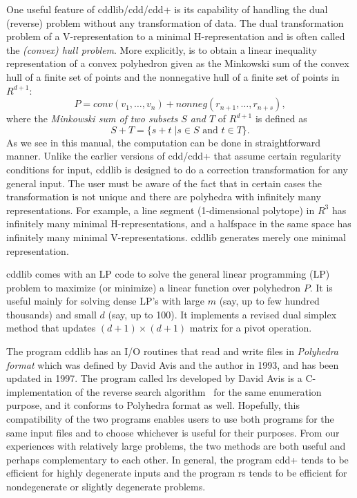 \documentclass[11pt]{article}
\newcommand {\0} {{\bf 0}}
\begin{document}
One useful feature of  cddlib/cdd/cdd+ is its capability
of handling the dual (reverse)  problem without any transformation
of data.  The dual transformation problem of a V-representation
to a minimal H-representation and is often called the 
{\em (convex) hull problem\/}.  More explicitly,
is to obtain a linear inequality representation
of a convex polyhedron given as the Minkowski sum of 
the convex hull of a finite set of points and the nonnegative
hull of a finite set of points in $R^{d+1}$: 
\[
P = conv(v_1,\ldots,v_n) +  nonneg(r_{n+1},\ldots,r_{n+s}), 
\]
where
 the {\em Minkowski sum of two subsets $S$ and $T$} of $R^{d+1}$ is defined
as 
\[
S + T = \{ s + t \; |  s \in S \mbox{ and } t \in T \}.
\]
As we see in this manual, the computation can be done
in straightforward manner.  Unlike the earlier versions of
cdd/cdd+ that assume certain regularity conditions for input, 
cddlib is designed to do a correction transformation for any general input.
The user must be aware of the fact that in certain cases the
transformation is not unique and there are polyhedra with
infinitely many representations.  For example, a line
segment (1-dimensional polytope) in $R^3$ has infinitely
many minimal H-representations, and a halfspace in the same space
has infinitely many minimal V-representations.  cddlib generates
merely one minimal representation.

cddlib comes with an LP code to solve the general
linear programming (LP) problem to maximize (or minimize) a linear
function over polyhedron $P$.   It is useful mainly for solving 
dense LP's with large $m$ (say, up to few hundred thousands) and small $d$ 
(say, up to 100).  It implements a revised dual simplex method that
updates $(d+1)\times (d+1)$ matrix for a pivot operation.

The program cddlib has an I/O routines that read and write files in 
{\em Polyhedra format\/} which was defined by David Avis and
the author in 1993, and has been updated in 1997.  
The program called lrs \cite{a-uglrs-97} developed by David Avis is
a C-implementation of the reverse search algorithm~\cite{af-pachv-92} 
for the same enumeration purpose, and it conforms to Polyhedra format as well.
Hopefully, this compatibility of the two programs
enables users to use both programs for the same input files
and to choose whichever is useful for their purposes.
From our experiences with relatively large problems,
the two methods are both useful and perhaps complementary
to each other.  In general, the program cdd+ tends to be
efficient for highly degenerate inputs and the program rs
tends to be efficient for nondegenerate or slightly
degenerate problems.
\end{document}
